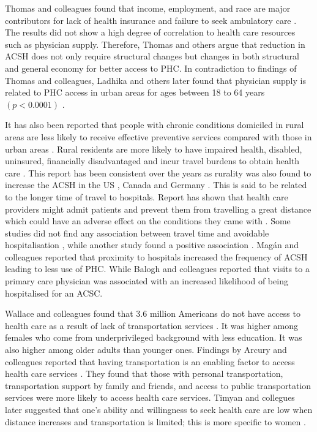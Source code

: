 Thomas and colleagues found that income, employment, and race are major contributors for lack of health insurance and failure to seek ambulatory care \cite{ricketts2001hospitalization}. The results did not show a high degree of correlation to health care resources such as physician supply. Therefore, Thomas and others argue that reduction in ACSH does not only require structural changes but changes in both structural and general economy for better access to PHC. In contradiction to findings of Thomas and colleagues, Ladhika and others later found that physician supply is related to PHC access in urban areas for ages between 18 to 64 years $(p<0.0001)$ \cite{laditka2005more}. 

It has also been reported that people with chronic conditions domiciled in rural areas are less likely to receive effective preventive services compared with those in urban areas \cite{casey2001rural}. Rural residents are more likely to have impaired health, disabled, uninsured, financially disadvantaged and incur travel burdens to obtain health care \cite{probst2004person,laditka2007health,laditka2009health,ziller2006out}. This report has been consistent over the years as rurality was also found to increase the ACSH in the US \cite{basu2014small}, Canada \cite{balogh2013factors} and Germany \cite{burgdorf2014potentially}. This is said to be related to the longer time of travel to hospitals. Report has shown that health care providers might admit patients and prevent them from travelling a great distance which could have an adverse effect on the conditions they came with \cite{laberge2017hospitalizations}. Some studies did not find any association between travel time and avoidable hospitalisation \cite{friedman2001health,magan2011hospitalizations}, while another study found a positive association \cite{bermudez2004organizational} . Magán and colleagues \citeyear{magan2011hospitalizations} reported that proximity to hospitals increased the frequency of ACSH leading to less use of PHC. While Balogh and colleagues \citeyear{balogh2013factors} reported that visits to a primary care physician was associated with an increased likelihood of being hospitalised for an ACSC. 

Wallace and colleagues found that 3.6 million Americans do not have access to health care as a result of lack of transportation services \cite{wallace2005access}. It was higher among females who come from underprivileged background with less education. It was also higher among older adults than younger ones. Findings by Arcury and colleagues reported that having transportation is an enabling factor to access health care services \cite{arcury2005access}. They found that those with personal transportation, transportation support by family and friends, and access to public transportation services were more likely to access health care services. Timyan and collegues later suggested that one's ability and willingness to seek health care are low when distance increases and transportation is limited; this is more specific to women \cite{timyan2018access}. 

